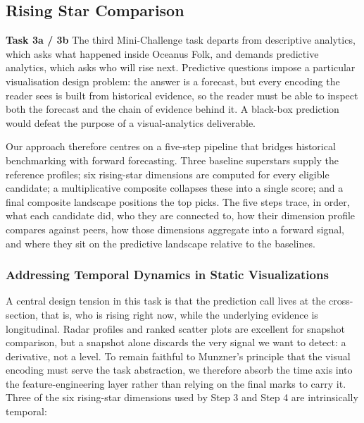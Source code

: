 \documentclass[journal]{vgtc}                     %
\begin{document}

\subsection{Rising Star Comparison}
\textbf{Task 3a / 3b}
The third Mini-Challenge task departs from descriptive analytics, which asks what happened inside Oceanus Folk, and demands predictive analytics, which asks who will rise next. Predictive questions impose a particular visualisation design problem: the answer is a forecast, but every encoding the reader sees is built from historical evidence, so the reader must be able to inspect both the forecast and the chain of evidence behind it. A black-box prediction would defeat the purpose of a visual-analytics deliverable.

Our approach therefore centres on a five-step pipeline that bridges historical benchmarking with forward forecasting. Three baseline superstars supply the reference profiles; six rising-star dimensions are computed for every eligible candidate; a multiplicative composite collapses these into a single score; and a final composite landscape positions the top picks. The five steps trace, in order, what each candidate did, who they are connected to, how their dimension profile compares against peers, how those dimensions aggregate into a forward signal, and where they sit on the predictive landscape relative to the baselines.

\subsubsection{Addressing Temporal Dynamics in Static Visualizations}
\label{sec:time_dim_viz_motivation}
A central design tension in this task is that the prediction call lives at the cross-section, that is, who is rising right now, while the underlying evidence is longitudinal. Radar profiles and ranked scatter plots are excellent for snapshot comparison, but a snapshot alone discards the very signal we want to detect: a derivative, not a level. To remain faithful to Munzner's principle that the visual encoding must serve the task abstraction, we therefore absorb the time axis into the feature-engineering layer rather than relying on the final marks to carry it. Three of the six rising-star dimensions used by Step 3 and Step 4 are intrinsically temporal:
\end{document}
